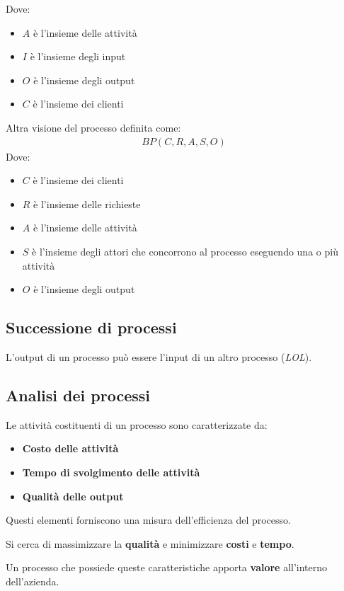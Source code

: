 Dove:
\begin{itemize}
  \item $A$ è l'insieme delle attività
  \item $I$ è l'insieme degli input
  \item $O$ è l'insieme degli output
  \item $C$ è l'insieme dei clienti
\end{itemize}

Altra visione del processo definita come:
\begin{align}
  BP(C, R, A, S, O)
\end{align}
Dove:
\begin{itemize}
  \item $C$ è l'insieme dei clienti
  \item $R$ è l'insieme delle richieste
  \item $A$ è l'insieme delle attività
  \item $S$ è l'insieme degli attori che concorrono al processo eseguendo una o più attività
  \item $O$ è l'insieme degli output
\end{itemize}

\subsection{Successione di processi}
L'output di un processo può essere l'input di un altro processo (\textit{LOL}).

\subsection{Analisi dei processi}
Le attività costituenti di un processo sono caratterizzate da:
\begin{itemize}
  \item \textbf{Costo delle attività}
  \item \textbf{Tempo di svolgimento delle attività}
  \item \textbf{Qualità delle output}
\end{itemize}


Questi elementi forniscono una misura dell'efficienza del processo.

Si cerca di massimizzare la \textbf{qualità} e minimizzare \textbf{costi} e \textbf{tempo}.



Un processo che possiede queste caratteristiche apporta \textbf{valore} all'interno dell'azienda.

